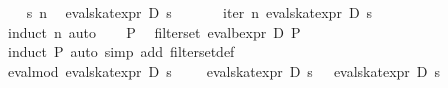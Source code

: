 \begin{isabellebody}
\ \ \isamarkupfalse%
\ s\ n\ \isamarkupfalse%
\ {}eval{}skat{}expr\ D\ s\ {}{}\ {}\ {}{}{}\isanewline
\ \ \isamarkupfalse%
\ {}iter\ n\ {}eval{}skat{}expr\ D\ s{}\ {}{}\ {}\ {}{}{}\isanewline
\ \ \ \ \isamarkupfalse%
\ {}induct\ n{}\ auto{}\isanewline
{}\isamarkupfalse%
\isanewline
\ \ \isamarkupfalse%
\ P\ \isamarkupfalse%
\ {}filter{}set\ {}eval{}bexpr\ D\ P{}\ {}{}\ {}\ {}{}{}\isanewline
\ \ \ \ \isamarkupfalse%
\ {}induct\ P{}\ auto\ simp\ add{}\ filter{}set{}def{}\isanewline
{}\isamarkupfalse%
%
\endisatagproof
{\isafoldproof}%
%
\isadelimproof
\isanewline
%
\endisadelimproof
\isanewline
{}\isamarkupfalse%
\ eval{}mod{}{}\ {}eval{}skat{}expr\ D\ s\ {}{}\ {}\ {}{}\ {}\ eval{}skat{}expr\ D\ s\ {}\ {}\ eval{}skat{}expr\ D\ s\ {}{}\isanewline

\end{isabellebody}
